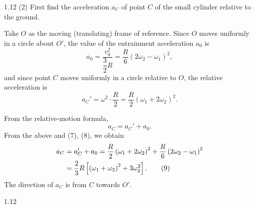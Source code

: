 \begin{solution}{1.12}
(2) First find the acceleration $a_C$ of point $C$ of the small cylinder relative to the ground.

Take $O$ as the moving (translating) frame of reference. Since $O$ moves uniformly in a circle
about $O'$, the value of the entrainment acceleration $a_0$ is
\begin{equation}
a_0 = \frac{v_0^2}{\dfrac{3}{2}R} = \frac{R}{6}\left(2\omega_2-\omega_1\right)^2, \tag{7}
\end{equation}
and since point $C$ moves uniformly in a circle relative to $O$, the relative acceleration is
\begin{equation}
a_C' = \omega^2\cdot\frac{R}{2} = \frac{R}{2}\left(\omega_1+2\omega_2\right)^2. \tag{8}
\end{equation}

From the relative-motion formula,
\begin{equation*}
a_C = a_C'+a_0.
\end{equation*}
From the above and (7), (8), we obtain
\begin{align}
a_C &= a_C'+a_0
= \frac{R}{2}\left(\omega_1+2\omega_2\right)^2+\frac{R}{6}\left(2\omega_2-\omega_1\right)^2
\notag\\
&= \frac{2}{3}R\left[\left(\omega_1+\omega_2\right)^2+3\omega_2^2\right]. \tag{9}
\end{align}
The direction of $a_C$ is from $C$ towards $O'$.

\begin{figbox}{1.12}
\end{figbox}


\end{solution}

